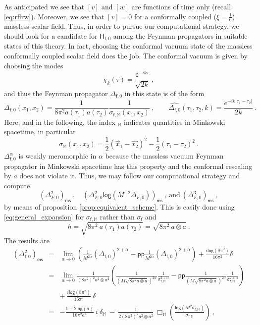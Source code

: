 \documentclass[11pt]{book}
\newcommand{\pp}{\mathsf{pp}}
\newcommand{\ms}{\mathsf{ms}}
\renewcommand{\log}{\mathsf{log}}
\newcommand{\Mbb}{\mathbb{M}}
\newcommand{\Hsf}{\mathsf{H}}
\newcommand{\esf}{\mathsf{e}}
\newcommand{\fsf}{\mathsf{f}}
\theoremstyle{break}
\begin{document}
As anticipated we see that $[v]$ and $[w]$ are functions of time only (recall \eqref{eq:rflrw}). Moreover, we see that $[v]=0$ for a conformally coupled ($\xi=\frac16$) massless scalar field. Thus, in order to pursue our computational strategy, we should look for a candidate for $\Hsf_{\fsf,0}$ among the Feynman propagators in suitable states of this theory. In fact, choosing the conformal vacuum state of the massless conformally coupled scalar field does the job. The conformal vacuum is given by choosing the modes
%
\begin{equation*}
\chi_k(\tau) = \frac{\esf^{-ik\tau}}{\sqrt{2k}} \ , 
\end{equation*}
%
and thus the Feynman propagator $\Delta_{\fsf,0}$ in this state is of the form
%
\begin{equation*}
\Delta_{\fsf,0}(x_1,x_2)=\frac{1}{8\pi^2 a(\tau_1)a(\tau_2)}\frac{1}{\sigma_{\fsf,\mathbb{M}}(x_1,x_2)} \ , \qquad 
\widehat{\Delta_{\fsf,0}}(\tau_1,\tau_2,k)=\frac{e^{-ik|\tau_1-\tau_2|}}{2k}\,.
\end{equation*}
%
Here, and in the following, the index $_{\Mbb}$ indicates quantities in Minkowski spacetime, in particular 
%
\begin{equation*}
\sigma_{\Mbb}(x_1,x_2) = \frac12 \left(\vec{x}_1-\vec{x_2}\right)^2 - \frac12 \left(\tau_1-\tau_2\right)^2 \ . 
\end{equation*}
%
$\Delta^\alpha_{\fsf,0}$ is weakly meromorphic in $\alpha$ because the massless vacuum Feynman propagator in Minkowski spacetime has this property and the conformal rescaling by $a$ does not violate it. Thus, we may follow our computational strategy and compute
%
\begin{equation*}
\left(\Delta^2_{F,0}\right)_\ms \ , \quad \left(\Delta^2_{F,0}\log\left(M^{-2}\Delta_{F,0}\right)\right)_\ms \ , \ \mbox{and} \ \left(\Delta^3_{F,0}\right)_\ms \ ,
\end{equation*}
%
by means of proposition \ref{prop:equivalent_scheme}. This is easily done using \eqref{eq:general_expansion} for $\sigma_{\fsf,\Mbb}$ rather than $\sigma_\fsf$ and
%
\begin{equation*}
h = \sqrt{8 \pi^2 \ a(\tau_1)a(\tau_2)} = \sqrt{8\pi^2 \  a\otimes a} \ . 
\end{equation*}
%
The results are
%
\begin{eqnarray*}
(\Delta_{\fsf,0}^2)_\ms &=& \lim_{\alpha\to 0} \left( \frac{1}{M^{2\alpha}}(\Delta_{\fsf,0})^{2+\alpha} - \pp\frac{1}{M^{2\alpha}}(\Delta_{\fsf,0})^{2+\alpha} \right) + \frac{i\log(8\pi^2)}{16\pi^2} \delta \\
&=& \lim_{\alpha\to 0} \frac{1}{(8\pi^2)^2 a^2\otimes a^2} \left(\frac{1}{(M\sqrt{8\pi^2 a\otimes a})^{2\alpha}}\frac{1}{\sigma_{\fsf,\mathbb{M}}^{2+\alpha}}-\pp \frac{1}{(M\sqrt{8\pi^2 a\otimes a})^{2\alpha}}\frac{1}{\sigma_{\fsf,\mathbb{M}}^{2+\alpha}}\right) \\
&& + \ \frac{i\log(8\pi^2)}{16\pi^2} \ \delta \\
&=& - \frac{1+2\log (a)}{16\pi^2 a^4} \ i \ \delta_\mathbb{M} \ - \ \frac{1}{2(8\pi^2)^2 a^2\otimes a^2} \ \Box_{\mathbb{M}}\left(\frac{\log\left(M^2\sigma_{\fsf,\mathbb{M}}\right)}{\sigma_{\fsf,\mathbb{M}}}\right) \ ,
\end{eqnarray*}
\end{document}
